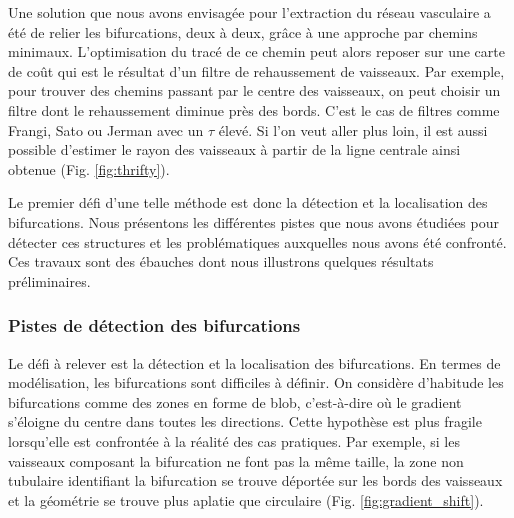 Une solution que nous avons envisagée pour l'extraction du réseau vasculaire a été de relier les bifurcations, deux à deux, grâce à une approche par chemins minimaux. L'optimisation du tracé de ce chemin peut alors reposer sur une carte de coût qui est le résultat d'un filtre de rehaussement de vaisseaux. Par exemple, pour trouver des chemins passant par le centre des vaisseaux, on peut choisir un filtre dont le rehaussement diminue près des bords. C'est le cas de filtres comme Frangi, Sato ou Jerman avec un $\tau$ élevé. Si l'on veut aller plus loin, il est aussi possible d'estimer le rayon des vaisseaux à partir de la ligne centrale ainsi obtenue (Fig. \ref{fig:thrifty}).

Le premier défi d'une telle méthode est donc la détection et la localisation des bifurcations. Nous présentons les différentes pistes que nous avons étudiées pour détecter ces structures et les problématiques auxquelles nous avons été confronté. Ces travaux sont des ébauches dont nous illustrons quelques résultats préliminaires.

\subsubsection{Pistes de détection des bifurcations}

Le défi à relever est la détection et la localisation des bifurcations. En termes de modélisation, les bifurcations sont difficiles à définir. On considère d'habitude les bifurcations comme des zones en forme de blob, c'est-à-dire où le gradient s'éloigne du centre dans toutes les directions. Cette hypothèse est plus fragile lorsqu'elle est confrontée à la réalité des cas pratiques. Par exemple, si les vaisseaux composant la bifurcation ne font pas la même taille, la zone non tubulaire identifiant la bifurcation se trouve déportée sur les bords des vaisseaux et la géométrie se trouve plus aplatie que circulaire (Fig. \ref{fig:gradient_shift}). 

